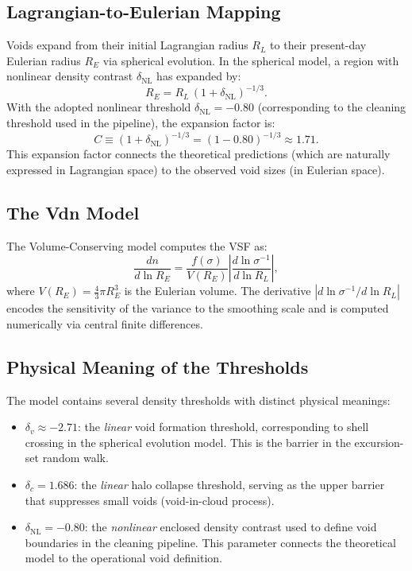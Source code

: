 \documentclass[12pt]{report}
\begin{document}
\subsection{Lagrangian-to-Eulerian Mapping}

Voids expand from their initial Lagrangian radius $R_L$ to their present-day Eulerian radius $R_E$ via spherical evolution. In the spherical model, a region with nonlinear density contrast $\delta_\mathrm{NL}$ has expanded by:
\begin{equation}
    R_E = R_L\,(1 + \delta_\mathrm{NL})^{-1/3}
    \label{eq:lag_to_eul}.
\end{equation}
With the adopted nonlinear threshold $\delta_\mathrm{NL} = -0.80$ (corresponding to the cleaning threshold used in the pipeline), the expansion factor is:
\begin{equation}
    C \equiv (1 + \delta_\mathrm{NL})^{-1/3} = (1 - 0.80)^{-1/3} \approx 1.71.
\end{equation}
This expansion factor connects the theoretical predictions (which are naturally expressed in Lagrangian space) to the observed void sizes (in Eulerian space).

\subsection{The Vdn Model}

The Volume-Conserving model \citep{Jennings2013} computes the VSF as:
\begin{equation}
    \frac{dn}{d\ln R_E} = \frac{f(\sigma)}{V(R_E)}\left|\frac{d\ln\sigma^{-1}}{d\ln R_L}\right|
    \label{eq:vdn},
\end{equation}
where $V(R_E) = \frac{4}{3}\pi R_E^3$ is the Eulerian volume. The derivative $|d\ln\sigma^{-1}/d\ln R_L|$ encodes the sensitivity of the variance to the smoothing scale and is computed numerically via central finite differences.

\subsection{Physical Meaning of the Thresholds}
\label{sec:thresholds}

The model contains several density thresholds with distinct physical meanings:

\begin{itemize}
    \item $\delta_v \approx -2.71$: the \emph{linear} void formation threshold, corresponding to shell crossing in the spherical evolution model. This is the barrier in the excursion-set random walk.

    \item $\delta_c = 1.686$: the \emph{linear} halo collapse threshold, serving as the upper barrier that suppresses small voids (void-in-cloud process).

    \item $\delta_\mathrm{NL} = -0.80$: the \emph{nonlinear} enclosed density contrast used to define void boundaries in the cleaning pipeline. This parameter connects the theoretical model to the operational void definition.
\end{itemize}
\end{document}

